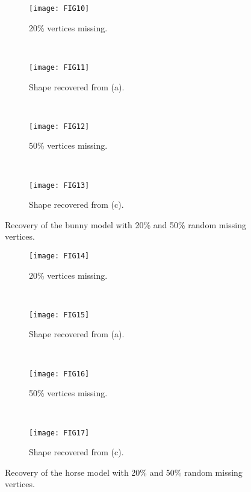 \begin{figure}
  \centering
    \begin{subfigure}[b]{0.23\linewidth}
        \texttt{[image: FIG10]}
        \caption{20\% vertices missing.}
    \end{subfigure}
    ~
    \begin{subfigure}[b]{0.23\linewidth}
        \texttt{[image: FIG11]}
        \caption{Shape recovered from (a).}
    \end{subfigure}
    ~
    \begin{subfigure}[b]{0.23\linewidth}
        \texttt{[image: FIG12]}
        \caption{50\% vertices missing.}
    \end{subfigure}
    ~
    \begin{subfigure}[b]{0.23\linewidth}
        \texttt{[image: FIG13]}
        \caption{Shape recovered from (c).}
    \end{subfigure}
\caption[Recovery of the bunny model with random missing vertices.]
{Recovery of the bunny model with 20\% and 50\% random missing vertices.}
\label{fig:bunny:recovery}
\end{figure}

\begin{figure}
  \centering
    \begin{subfigure}[b]{0.35\linewidth}
        \texttt{[image: FIG14]}
        \caption{20\% vertices missing.}
    \end{subfigure}
    ~
    \begin{subfigure}[b]{0.35\linewidth}
        \texttt{[image: FIG15]}
        \caption{Shape recovered from (a).}
    \end{subfigure}
    \\
    \begin{subfigure}[b]{0.35\linewidth}
        \texttt{[image: FIG16]}
        \caption{50\% vertices missing.}
    \end{subfigure}
    ~
    \begin{subfigure}[b]{0.35\linewidth}
        \texttt{[image: FIG17]}
        \caption{Shape recovered from (c).}
    \end{subfigure}
\caption[Recovery of the horse model with random missing vertices.]
{Recovery of the horse model with 20\% and 50\% random missing vertices.}
\label{fig:horse:recovery}
\end{figure}


